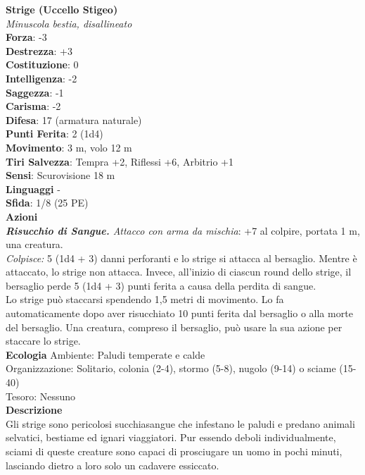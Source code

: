 \begin{multicols}{2}
\medskip\textbf{Strige (Uccello Stigeo)}\\
\emph{Minuscola bestia, disallineato}\\
\textbf{Forza}: -3\\
\textbf{Destrezza}: +3\\
\textbf{Costituzione}: 0\\
\textbf{Intelligenza}: -2\\
\textbf{Saggezza}: -1\\
\textbf{Carisma}: -2\\
\textbf{Difesa}: 17 (armatura naturale)\\
\textbf{Punti Ferita}: 2 (1d4)\\
\textbf{Movimento}: 3 m, volo 12 m\\
\textbf{Tiri Salvezza}: Tempra +2, Riflessi +6, Arbitrio +1\\
\textbf{Sensi}: Scurovisione 18 m\\
\textbf{Linguaggi} -\\
\textbf{Sfida}: 1/8 (25 PE)\smallskip\\
\smallskip\textbf{Azioni}\\
\emph{\textbf{Risucchio di Sangue.} Attacco con arma da mischia}: +7 al colpire, portata 1 m, una creatura.\\
\emph{Colpisce:} 5 (1d4 + 3) danni perforanti e lo strige si attacca al bersaglio. Mentre è attaccato, lo strige non attacca. Invece, all'inizio di ciascun round dello strige, il bersaglio perde 5 (1d4 + 3) punti ferita a causa della perdita di sangue.\\
Lo strige può staccarsi spendendo 1,5 metri di movimento. Lo fa automaticamente dopo aver risucchiato 10 punti ferita dal bersaglio o alla morte del bersaglio. Una creatura, compreso il bersaglio, può usare la sua azione per staccare lo strige.\\
\textbf{Ecologia}
Ambiente: Paludi temperate e calde\\
Organizzazione: Solitario, colonia (2-4), stormo (5-8), nugolo (9-14) o sciame (15-40)\\
Tesoro: Nessuno\\
\textbf{Descrizione}\\
Gli strige sono pericolosi succhiasangue che infestano le paludi e predano animali selvatici, bestiame ed ignari viaggiatori. Pur essendo deboli individualmente, sciami di queste creature sono capaci di prosciugare un uomo in pochi minuti, lasciando dietro a loro solo un cadavere essiccato.\\


\end{multicols}
